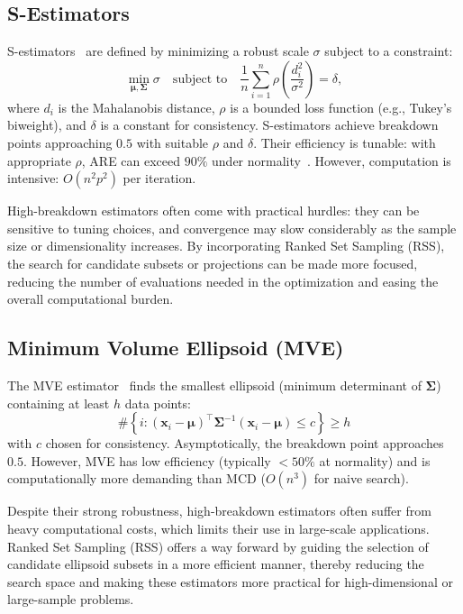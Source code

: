 \documentclass[12pt]{article}
\begin{document}
\subsection{S-Estimators}
S-estimators~\cite{maronna2019robust} are defined by minimizing a robust scale $\sigma$ subject to a constraint:
\[
\min_{\bm{\mu}, \bm{\Sigma}} \sigma \quad \text{subject to} \quad \frac{1}{n} \sum_{i=1}^n \rho\left( \frac{d_i^2}{\sigma^2} \right) = \delta,
\]
where $d_i$ is the Mahalanobis distance, $\rho$ is a bounded loss function (e.g., Tukey's biweight), and $\delta$ is a constant for consistency.
S-estimators achieve breakdown points approaching $0.5$ with suitable $\rho$ and $\delta$. Their efficiency is tunable: with appropriate $\rho$, ARE can exceed $90\%$ under normality~\cite{maronna2019robust}. However, computation is intensive: $O(n^2p^2)$ per iteration.

High-breakdown estimators often come with practical hurdles: they can be sensitive to tuning choices, and convergence may slow considerably as the sample size or dimensionality increases. By incorporating Ranked Set Sampling (RSS), the search for candidate subsets or projections can be made more focused, reducing the number of evaluations needed in the optimization and easing the overall computational burden.

\subsection{Minimum Volume Ellipsoid (MVE)}
The MVE estimator~\cite{rousseeuw1985multivariate} finds the smallest ellipsoid (minimum determinant of $\bm{\Sigma}$) containing at least $h$ data points:
\[
\#\left\{ i : (\mathbf{x}_i - \bm{\mu})^\top \bm{\Sigma}^{-1} (\mathbf{x}_i - \bm{\mu}) \leq c \right\} \geq h
\]
with $c$ chosen for consistency.
Asymptotically, the breakdown point approaches $0.5$. However, MVE has low efficiency (typically $<50\%$ at normality) and is computationally more demanding than MCD ($O(n^3)$ for naive search).

Despite their strong robustness, high-breakdown estimators often suffer from heavy computational costs, which limits their use in large-scale applications. Ranked Set Sampling (RSS) offers a way forward by guiding the selection of candidate ellipsoid subsets in a more efficient manner, thereby reducing the search space and making these estimators more practical for high-dimensional or large-sample problems.
\end{document}

